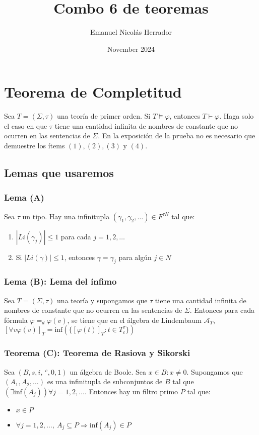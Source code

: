 \documentclass{article}
\title{Combo 6 de teoremas}
\author{Emanuel Nicolás Herrador}
\date{November 2024}
\begin{document}
\maketitle

\section*{Teorema de Completitud}
Sea $T=(\Sigma,\tau)$ una teoría de primer orden. Si $T\vDash\varphi$, entonces $T\vdash\varphi$.
\newline
Haga solo el caso en que $\tau$ tiene una cantidad infinita de nombres de constante que no ocurren en las sentencias de $\Sigma$. En la exposición de la prueba no es necesario que demuestre los ítems $(1),(2),(3)$ y $(4)$.
\subsection*{Lemas que usaremos}
\subsubsection*{Lema (A)}
Sea $\tau$ un tipo. Hay una infinitupla $(\gamma_1,\gamma_2,\dots)\in F^{\tau N}$ tal que:
\begin{enumerate}
  \item $|Li(\gamma_j)|\leq 1$ para cada $j=1,2,\dots$
  \item Si $|Li(\gamma)|\leq 1$, entonces $\gamma=\gamma_j$ para algún $j\in N$
\end{enumerate}

\subsubsection*{Lema (B): Lema del ínfimo}
Sea $T=(\Sigma,\tau)$ una teoría y supongamos que $\tau$ tiene una cantidad infinita de nombres de constante que no ocurren en las sentencias de $\Sigma$. Entonces para cada fórmula $\varphi=_d\varphi(v)$, se tiene que en el álgebra de Lindembaum $\mathcal{A}_T$, $[\forall v\varphi(v)]_T=\text{inf}(\{[\varphi(t)]_T:t\in T^\tau_c\})$

\subsubsection*{Teorema (C): Teorema de Rasiova y Sikorski}
Sea $(B,s,i,\ ^c,0,1)$ un álgebra de Boole. Sea $x\in B:x\neq 0$. Supongamos que $(A_1,A_2,\dots)$ es una infinitupla de subconjuntos de $B$ tal que $(\exists\text{inf}(A_j))\forall j=1,2,\dots$. Entonces hay un filtro primo $P$ tal que:
\begin{itemize}
  \item $x\in P$
  \item $\forall j=1,2,\dots,\ A_j\subseteq P\Rightarrow\text{inf}(A_j)\in P$
\end{itemize}
\end{document}
